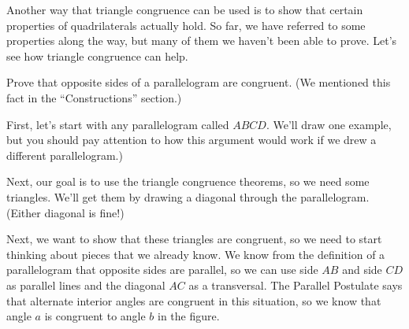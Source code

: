 \documentclass{ximera}
\begin{document}
Another way that triangle congruence can be used is to show that certain properties of quadrilaterals actually hold. So far, we have referred to some properties along the way, but many of them we haven't been able to prove. Let's see how triangle congruence can help.

\begin{example}
Prove that opposite sides of a parallelogram are congruent. (We mentioned this fact in the ``Constructions'' section.)

First, let's start with any parallelogram called $ABCD$. We'll draw one example, but you should pay attention to how this argument would work if we drew a different parallelogram.)
\begin{center}\end{center}
Next, our goal is to use the triangle congruence theorems, so we need some triangles. We'll get them by drawing a diagonal through the parallelogram. (Either diagonal is fine!)
\begin{center}\end{center}
Next, we want to show that these triangles are congruent, so we need to start thinking about pieces that we already know. We know from the definition of a parallelogram that opposite sides are parallel, so we can use side $AB$ and side $CD$ as parallel lines and the diagonal $AC$ as a transversal. The Parallel Postulate says that alternate interior angles are congruent in this situation, so we know that angle $a$ is congruent to angle $b$ in the figure.
\begin{center}\end{center}

\end{example}
\end{document}
